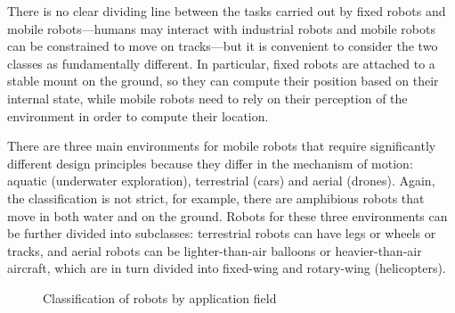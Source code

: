 There is no clear dividing line between the tasks carried out by fixed robots and mobile robots---humans may interact with industrial robots and mobile robots can be constrained to move on tracks---but it is convenient to consider the two classes as fundamentally different. In particular, fixed robots are attached to a stable mount on the ground, so they can compute their position based on their internal state, while mobile robots need to rely on their perception of the environment in order to compute their location.

There are three main environments for mobile robots that require significantly different design principles because they differ in the mechanism of motion: aquatic (underwater exploration), terrestrial (cars) and aerial (drones). Again, the classification is not strict, for example, there are amphibious robots that move in both water and on the ground. Robots for these three environments can be further divided into subclasses: terrestrial robots can have legs or wheels or tracks, and aerial robots can be lighter-than-air balloons or heavier-than-air aircraft, which are in turn divided into fixed-wing and rotary-wing (helicopters).

\begin{figure}
\begin{center}
\end{center}
\caption{Classification of robots by application field}\label{fig.classification2}
\end{figure}

